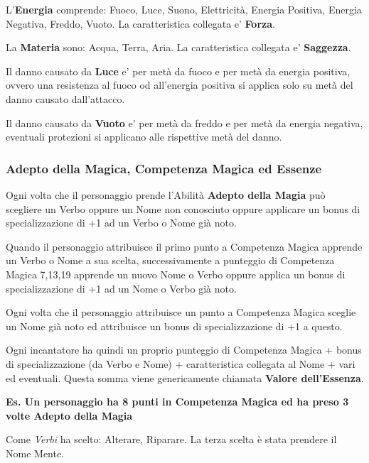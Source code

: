 \documentclass[a4paper,twoside,openany]{book}
\begin{document}
\begin{multicols}{2}
L'\textbf{Energia} comprende: Fuoco, Luce, Suono, Elettricità, Energia Positiva, Energia Negativa, Freddo, Vuoto. La caratteristica collegata e' \textbf{Forza}.

La \textbf{Materia} sono: Acqua, Terra, Aria. La caratteristica collegata e' \textbf{Saggezza}.

\smallskip

Il danno causato da \textbf{Luce} e' per metà da fuoco e per metà da energia positiva, ovvero una resistenza al fuoco od all'energia positiva si applica solo su metà del danno causato dall'attacco.

Il danno causato da \textbf{Vuoto} e' per metà da freddo e per metà da energia negativa, eventuali protezioni si applicano alle rispettive metà del danno.

\subsubsection{Adepto della Magica, Competenza Magica ed Essenze}

\label{competenza-magica-ed-essenza}

Ogni volta che il personaggio prende l'Abilità \textbf{Adepto della Magia} può scegliere un Verbo oppure un Nome non conosciuto oppure applicare un bonus di specializzazione di +1 ad un Verbo o Nome già noto.

Quando il personaggio attribuisce il primo punto a Competenza Magica apprende un Verbo o Nome a sua scelta, successivamente a punteggio di Competenza Magica 7,13,19 apprende un nuovo Nome o Verbo oppure applica un bonus di specializzazione di +1 ad un Nome o Verbo già noto.

Ogni volta che il personaggio attribuisce un punto a Competenza Magica sceglie un Nome già noto ed attribuisce un bonus di specializzazione di +1 a questo.

Ogni incantatore ha quindi un proprio punteggio di Competenza Magica + bonus di specializzazione (da Verbo e Nome) + caratteristica collegata al Nome + vari ed eventuali. Questa somma viene genericamente chiamata \textbf{Valore dell'Essenza}.

\bigskip

\textbf{Es. Un personaggio ha 8 punti in Competenza Magica ed ha preso 3 volte Adepto della Magia}

Come \textit{Verbi} ha scelto: Alterare, Riparare. La terza scelta è stata prendere il Nome Mente.\\


\end{multicols}
\end{document}
